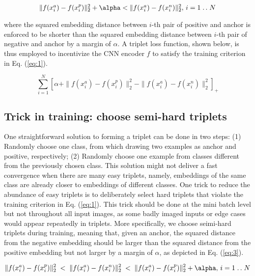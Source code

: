 \newcommand{\isep}{\mathrel{{.}\,{.}}\nobreak}
\begin{equation} \label{eq:1}
    \begin{array}{l}
       \|f(x_i^a) - f(x_i^p)\|_2^2 + \alpha < \|f(x_i^a) - f(x_i^n)\|_2^2, \, i = 1 \isep N
    \end{array}
\end{equation}

where the squared embedding distance between $i$-th pair of positive and anchor
is enforced to be shorter than the squared embedding distance between $i$-th
pair of negative and anchor by a margin of $\alpha$.  A triplet loss function,
shown below, is thus employed to incentivize the CNN encoder $f$ to satisfy the
training criterion in Eq. (\ref{eq:1}).

\begin{equation}
    \sum_{i=1}^{N} \left[ \alpha + \|f(x_i^a) - f(x_i^p)\|_2^2 - \|f(x_i^a) -
    f(x_i^n)\|_2^2 \right]_+
\end{equation}


\subsection{Trick in training: choose semi-hard triplets}

One straightforward solution to forming a triplet can be done in two steps: (1)
Randomly choose one class, from which drawing two examples as anchor and
positive, respectively; (2) Randomly choose one example from classes different
from the previously chosen class.  This solution might not deliver a fast
convergence when there are many easy triplets, namely, embeddings of the same
class are already closer to embeddings of different classes.  One trick to
reduce the abundance of easy triplets is to deliberately select hard triplets
that violate the training criterion in Eq. (\ref{eq:1}).  This trick should be
done at the mini batch level but not throughout all input images, as some badly
imaged inputs or edge cases would appear repeatedly in triplets.  More
specifically, we choose seimi-hard triplets during training, meaning that, given
an anchor, the squared distance from the negative embedding should be larger
than the squared distance from the positive embedding but not larger by a margin
of $\alpha$, as depicted in Eq. (\ref{eq:3}).

\begin{equation}\label{eq:3}
    \|f(x_i^a) - f(x_i^p)\|_2^2 \;<\; \|f(x_i^a) - f(x_i^n)\|_2^2 \;<\; \|f(x_i^a) - f(x_i^p)\|_2^2 + \alpha, \, i = 1 \isep N
\end{equation}


